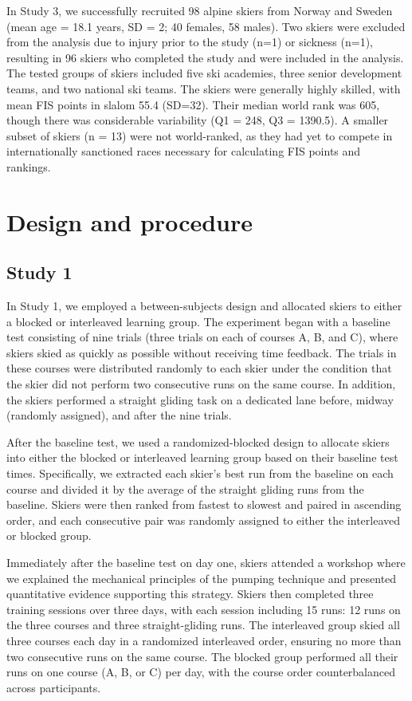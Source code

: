 In Study 3, we successfully recruited 98 alpine skiers from Norway and Sweden (mean age = 18.1 years, SD = 2; 40 females, 58 males). Two skiers were excluded from the analysis due to injury prior to the study (n=1) or sickness (n=1), resulting in 96 skiers who completed the study and were included in the analysis. The tested groups of skiers included five ski academies, three senior development teams, and two national ski teams. The skiers were generally highly skilled, with mean FIS points in slalom 55.4 (SD=32). Their median world rank was 605, though there was considerable variability (Q1 = 248, Q3 = 1390.5). A smaller subset of skiers (n = 13) were not world-ranked, as they had yet to compete in internationally sanctioned races necessary for calculating FIS points and rankings. 

\section{Design and procedure}

\subsection{Study 1}
In Study 1, we employed a between-subjects design and allocated skiers to either a blocked or interleaved learning group. The experiment began with a baseline test consisting of nine trials (three trials on each of courses A, B, and C), where skiers skied as quickly as possible without receiving time feedback. The trials in these courses were distributed randomly to each skier under the condition that the skier did not perform two consecutive runs on the same course. In addition, the skiers performed a straight gliding task on a dedicated lane before, midway (randomly assigned), and after the nine trials.

After the baseline test, we used a randomized-blocked design to allocate skiers into either the blocked or interleaved learning group based on their baseline test times. Specifically, we extracted each skier's best run from the baseline on each course and divided it by the average of the straight gliding runs from the baseline. Skiers were then ranked from fastest to slowest and paired in ascending order, and each consecutive pair was randomly assigned to either the interleaved or blocked group.

Immediately after the baseline test on day one, skiers attended a workshop where we explained the mechanical principles of the pumping technique and presented quantitative evidence supporting this strategy. Skiers then completed three training sessions over three days, with each session including 15 runs: 12 runs on the three courses and three straight-gliding runs. The interleaved group skied all three courses each day in a randomized interleaved order, ensuring no more than two consecutive runs on the same course. The blocked group performed all their runs on one course (A, B, or C) per day, with the course order counterbalanced across participants. 

